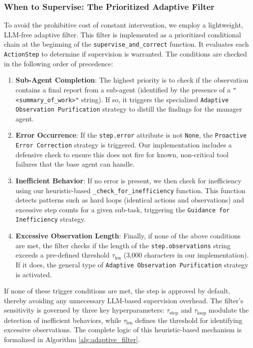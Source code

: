 \subsubsection{When to Supervise: The Prioritized Adaptive Filter}
To avoid the prohibitive cost of constant intervention, we employ a lightweight, LLM-free adaptive filter. This filter is implemented as a prioritized conditional chain at the beginning of the \texttt{supervise\_and\_correct} function. It evaluates each \texttt{ActionStep} to determine if supervision is warranted. The conditions are checked in the following order of precedence:

\begin{enumerate}[nosep, leftmargin=15pt]
    \item \textbf{Sub-Agent Completion}: The highest priority is to check if the observation contains a final report from a sub-agent (identified by the presence of a \texttt{"\textless summary\_of\_work\textgreater"} string). If so, it triggers the specialized \texttt{Adaptive Observation Purification} strategy to distill the findings for the manager agent.
    \item \textbf{Error Occurrence}: If the \texttt{step.error} attribute is not \texttt{None}, the \texttt{Proactive Error Correction} strategy is triggered. Our implementation includes a defensive check to ensure this does not fire for known, non-critical tool failures that the base agent can handle.
    \item \textbf{Inefficient Behavior}: If no error is present, we then check for inefficiency using our heuristic-based \texttt{\_check\_for\_inefficiency} function. This function detects patterns such as hard loops (identical actions and observations) and excessive step counts for a given sub-task, triggering the \texttt{Guidance for Inefficiency} strategy.
    \item \textbf{Excessive Observation Length}: Finally, if none of the above conditions are met, the filter checks if the length of the \texttt{step.observations} string exceeds a pre-defined threshold $\tau_{\text{len}}$ (3,000 characters in our implementation). If it does, the general type of \texttt{Adaptive Observation Purification} strategy is activated.
\end{enumerate}

If none of these trigger conditions are met, the step is approved by default, thereby avoiding any unnecessary LLM-based supervision overhead. 
The filter’s sensitivity is governed by three key hyperparameters: $\tau_{\text{step}}$ and $\tau_{\text{loop}}$ modulate the detection of inefficient behaviors, while $\tau_{\text{len}}$ defines the threshold for identifying excessive observations.
The complete logic of this heuristic-based mechanism is formalized in Algorithm \ref{alg:adaptive_filter}.



